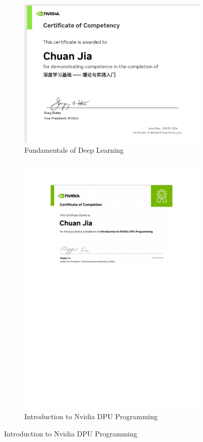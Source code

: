 \documentclass[12pt]{article}
\begin{document}
\begin{figure}[H]
	\small
	\centering
	\begin{subfigure}[b]{0.48\textwidth}
		\includegraphics[width=\linewidth]{Chuan_Jia_FDL_Certification.png}
		\caption{Fundamentals of Deep Learning}
	\end{subfigure}
	\hfill
	\begin{subfigure}[b]{0.48\textwidth}
		\includegraphics[width=\linewidth]{Chuan_Jia_INDP_Certification.pdf}
		\caption{Introduction to Nvidia DPU Programming}
	\end{subfigure}
	

\end{figure}
\end{document}
